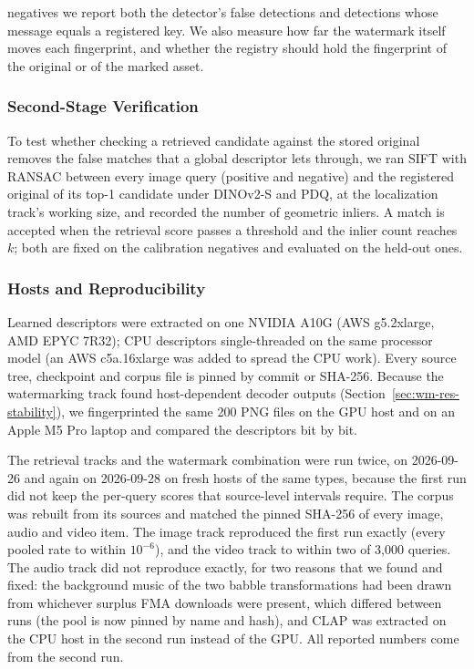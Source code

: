 negatives we report both the detector's false detections and detections whose message equals a registered key. We also measure how far the watermark itself moves each fingerprint, and whether the registry should hold the fingerprint of the original or of the marked asset.

\subsubsection{Second-Stage Verification}
To test whether checking a retrieved candidate against the stored original removes the false matches that a global descriptor lets through, we ran SIFT with RANSAC between every image query (positive and negative) and the registered original of its top-1 candidate under DINOv2-S and PDQ, at the localization track's working size, and recorded the number of geometric inliers. A match is accepted when the retrieval score passes a threshold and the inlier count reaches $k$; both are fixed on the calibration negatives and evaluated on the held-out ones.

\subsubsection{Hosts and Reproducibility}
Learned descriptors were extracted on one NVIDIA A10G (AWS g5.2xlarge, AMD EPYC 7R32); CPU descriptors single-threaded on the same processor model (an AWS c5a.16xlarge was added to spread the CPU work). Every source tree, checkpoint and corpus file is pinned by commit or SHA-256. Because the watermarking track found host-dependent decoder outputs (Section~\ref{sec:wm-res-stability}), we fingerprinted the same 200 PNG files on the GPU host and on an Apple M5 Pro laptop and compared the descriptors bit by bit.

The retrieval tracks and the watermark combination were run twice, on 2026-09-26 and again on 2026-09-28 on fresh hosts of the same types, because the first run did not keep the per-query scores that source-level intervals require. The corpus was rebuilt from its sources and matched the pinned SHA-256 of every image, audio and video item. The image track reproduced the first run exactly (every pooled rate to within $10^{-6}$), and the video track to within two of 3{,}000 queries. The audio track did not reproduce exactly, for two reasons that we found and fixed: the background music of the two babble transformations had been drawn from whichever surplus FMA downloads were present, which differed between runs (the pool is now pinned by name and hash), and CLAP was extracted on the CPU host in the second run instead of the GPU. All reported numbers come from the second run.

